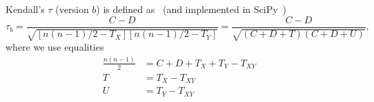 Kendall's $\tau$ (version $b$) is defined as~\cite{kendall1945,agresti2010analysis} (and implemented in SciPy~\cite{scipy})
\begin{equation*}
\tau_b = \frac{C - D}{\sqrt{[n(n-1)/2 - T_X] [n(n-1)/2 - T_Y]}} = \frac{C - D}{\sqrt{(C + D + T) (C + D + U)}},
\end{equation*}
where we use equalities 
\begin{align*}
\frac{n(n-1)}{2} &= C + D + T_X + T_Y - T_{XY} \\
T &= T_X - T_{XY} \\
U &= T_Y - T_{XY}
\end{align*}
